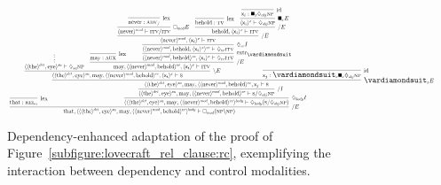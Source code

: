 \begin{figure}
	\[
	\resizebox{1\textwidth}{!}{
		\infer[\divright E]{\w{that}, \dbra{\dbra{\dbra{\w{the}}{det}, \w{eye}}{su}, \w{may}, \dbra{\dbra{\w{never}}{mod}, \w{behold}}{vc}}{body} \vdash \dbox{mod}(\np\divleft\np)}{
			\infer[\Lex]{\w{that} :  \subcat{l}{rel}{o}}{}
			&
			\hspace{-50pt}
			\infer[\ddia{body}I]{\dbra{\dbra{\dbra{\w{the}}{det}, \w{eye}}{su}, \w{may}, \dbra{\dbra{\w{never}}{mod}, \w{behold}}{vc}}{body} \vdash \ddia{body}(\s\divright\ddia{obj}\np)}{
				\infer[\divright I]{\dbra{\dbra{\w{the}}{det}, \w{eye}}{su}, \w{may}, \dbra{\dbra{\w{never}}{mod}, \w{behold}}{vc} \vdash \s\divright\ddia{obj}\np}{
					\infer[\dxdia{x}E]{\dbra{\dbra{\w{the}}{det}, \w{eye}}{su}, \w{may}, \dbra{\dbra{\w{never}}{mod}, \w{behold}}{vc}, \varj \vdash \s}{
						\infer[\divleft E]{\dbra{\dbra{\w{the}}{det}, \w{eye}}{su}, \w{may}, \dbra{\dbra{\w{never}}{mod}, \w{behold}}{vc}, \dbra{\vari}{x} \vdash \s}{
							\infer*{\dbra{\dbra{\w{the}}{det}, \w{eye}}{su} \vdash \ddia{su}\np}{	}
							&
							\infer[\divright E]{\w{may}, \dbra{\dbra{\w{never}}{mod}, \w{behold}}{vc}, \dbra{\vari}{x} \vdash \gtype{itv}}{
								\infer[\Lex]{\w{may} : \gtype{aux}}{}
								&
								\hspace{-25pt}\infer[\Extraction]{\dbra{\dbra{\w{never}}{mod}, \w{behold}}{vc}, \dbra{\vari}{x} \vdash \ddia{vc}\gtype{itv}}{
									\infer[\ddia{vc}I]{\dbra{\dbra{\w{never}}{mod}, \w{behold}, \dbra{\vari}{x}}{vc} \vdash \ddia{vc}\gtype{itv}}{
										\infer[\divright E]{\dbra{\w{never}}{mod}, \dbra{\vari}{x} \vdash \gtype{itv}}{
											\infer[\dbox{mod}E]{\dbra{\w{never}}{mod} \vdash \gtype{itv}\divright\gtype{itv}}{
												\infer[\Lex]{\w{never} : \gtype[l]{adv}_{\divright}}{}
											}
											&
											\infer[\divright E]{\w{behold}, \dbra{\vari}{x} \vdash \gtype{itv}}{
												\infer[\Lex]{\w{behold}: \gtype[l]{tv}}{}
												&
												\infer[\dxbox{x} E]{\dbra{\vari}{x} \vdash \ddia{obj} \np}{
													\infer[\Ax]{\vari : \dxbox{x}\ddia{obj}\np}{}
												}
											}
										}
									}
								}
							}
						}
						&
						\hspace{-60pt}
						\infer[\Ax]{\varj : \dxdia{x}\dxbox{x}\ddia{obj}\np}{}
					}
				}
			}
		}
	}
	\]
	\caption{Dependency-enhanced adaptation of the proof of Figure~\ref{subfigure:lovecraft_rel_clause:rc}, exemplifying the interaction between dependency and control modalities.}
	\label{figure:lovecraft_dep_rep_clause}
\end{figure}



